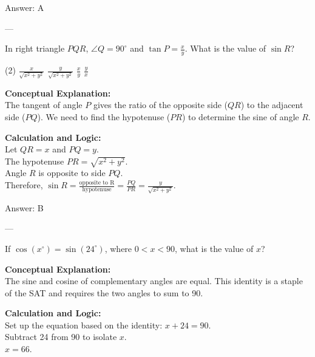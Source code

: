 \documentclass[11pt,paper=a4,answers]{exam}
\begin{document}
\begin{questions}
\begin{solution}
\vspace{15pt}
Answer: \colorbox{yellow!100}{A}
\end{solution}

---

\question
In right triangle $PQR$, $\angle Q = 90^\circ$ and $\tan P = \frac{x}{y}$. What is the value of $\sin R$?
\begin{tasks}(2)
    \task $\frac{x}{\sqrt{x^2+y^2}}$
    \task $\frac{y}{\sqrt{x^2+y^2}}$
    \task $\frac{x}{y}$
    \task $\frac{y}{x}$
\end{tasks}

\begin{solution}
\textbf{Conceptual Explanation:} \\
The tangent of angle $P$ gives the ratio of the opposite side ($QR$) to the adjacent side ($PQ$). We need to find the hypotenuse ($PR$) to determine the sine of angle $R$.

\vspace{10pt}
\textbf{Calculation and Logic:} \\
Let $QR = x$ and $PQ = y$. \\
The hypotenuse $PR = \sqrt{x^2 + y^2}$. \\
Angle $R$ is opposite to side $PQ$. \\
Therefore, $\sin R = \frac{\text{opposite to R}}{\text{hypotenuse}} = \frac{PQ}{PR} = \frac{y}{\sqrt{x^2 + y^2}}$.

\vspace{15pt}
Answer: \colorbox{yellow!100}{B}
\end{solution}

---

\question
If $\cos(x^\circ) = \sin(24^\circ)$, where $0 < x < 90$, what is the value of $x$?

\begin{solution}
\textbf{Conceptual Explanation:} \\
The sine and cosine of complementary angles are equal. This identity is a staple of the SAT and requires the two angles to sum to 90.

\vspace{10pt}
\textbf{Calculation and Logic:} \\
Set up the equation based on the identity: $x + 24 = 90$. \\
Subtract 24 from 90 to isolate $x$. \\
$x = 66$.


\end{solution}
\end{questions}
\end{document}
